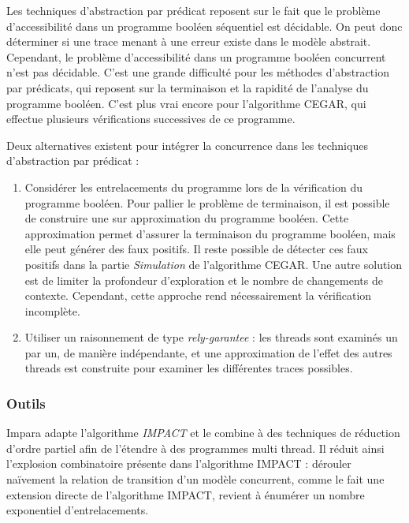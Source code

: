 Les techniques d'abstraction par prédicat reposent sur le fait que le problème
d'accessibilité dans un programme booléen séquentiel est décidable. On peut donc
déterminer si une trace menant à une erreur existe dans le modèle abstrait.
Cependant, le problème d'accessibilité dans un programme booléen concurrent
n'est pas décidable. C'est une grande difficulté pour les méthodes
d'abstraction par prédicats, qui reposent sur la terminaison et la rapidité de
l'analyse du programme booléen. C'est plus vrai encore pour l'algorithme \ac{CEGAR},
qui effectue plusieurs vérifications successives de ce programme.

Deux alternatives existent pour intégrer la concurrence dans les techniques
d'abstraction par prédicat :

\begin{enumerate}
\def\labelenumi{\arabic{enumi})}
\item
  Considérer les entrelacements du programme lors de la vérification du
  programme booléen. Pour pallier le problème de terminaison, il est
  possible de construire une sur approximation du programme booléen.
  Cette approximation permet d'assurer la terminaison du programme
  booléen, mais elle peut générer des faux positifs. Il reste possible
  de détecter ces faux positifs dans la partie \emph{Simulation} de
  l'algorithme \ac{CEGAR}\cite{predicate_abstraction_over_approximation}.
  Une autre solution est de limiter la profondeur d'exploration et le
  nombre de changements de contexte. Cependant, cette approche rend
  nécessairement la vérification incomplète.
\item
  Utiliser un raisonnement de type
  \emph{rely-garantee}\cite{thread_modular_abstraction} : les
  threads sont examinés un par un, de manière indépendante, et une approximation
  de l'effet des autres threads est construite pour examiner les différentes
  traces possibles.
\end{enumerate}

\subsubsection{Outils}

Impara\cite{Impara} adapte l'algorithme \emph{IMPACT}\cite{IMPACT} et le combine
à des techniques de réduction d'ordre partiel afin de l'étendre à des programmes
multi thread. Il réduit ainsi l'explosion combinatoire présente dans l'algorithme
IMPACT : dérouler naïvement la relation de transition d'un modèle concurrent,
comme le fait une extension directe de l'algorithme IMPACT, revient à
énumérer un nombre exponentiel d'entrelacements.


